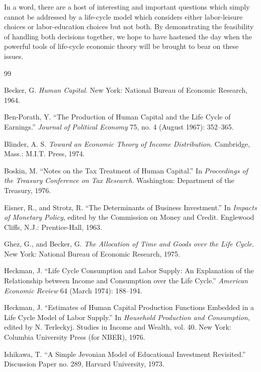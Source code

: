 \documentclass[11pt,fleqn]{article}
\begin{document}
In a word, there are a host of interesting and important questions which simply cannot be addressed by a life-cycle model which considers either labor-leisure choices or labor-education choices but not both. By demonstrating the feasibility of handling both decisions together, we hope to have hastened the day when the powerful tools of life-cycle economic theory will be brought to bear on these issues.

\begin{thebibliography}{99}

Becker, G. \textit{Human Capital}. New York: National Bureau of Economic Research, 1964.

Ben-Porath, Y. ``The Production of Human Capital and the Life Cycle of Earnings.'' \textit{Journal of Political Economy} 75, no. 4 (August 1967): 352--365.

Blinder, A. S. \textit{Toward an Economic Theory of Income Distribution}. Cambridge, Mass.: M.I.T. Press, 1974.

Boskin, M. ``Notes on the Tax Treatment of Human Capital.'' In \textit{Proceedings of the Treasury Conference on Tax Research}. Washington: Department of the Treasury, 1976.

Eisner, R., and Strotz, R. ``The Determinants of Business Investment.'' In \textit{Impacts of Monetary Policy}, edited by the Commission on Money and Credit. Englewood Cliffs, N.J.: Prentice-Hall, 1963.

Ghez, G., and Becker, G. \textit{The Allocation of Time and Goods over the Life Cycle}. New York: National Bureau of Economic Research, 1975.

Heckman, J. ``Life Cycle Consumption and Labor Supply: An Explanation of the Relationship between Income and Consumption over the Life Cycle.'' \textit{American Economic Review} 64 (March 1974): 188--194.

Heckman, J. ``Estimates of Human Capital Production Functions Embedded in a Life Cycle Model of Labor Supply.'' In \textit{Household Production and Consumption}, edited by N. Terleckyj. Studies in Income and Wealth, vol. 40. New York: Columbia University Press (for NBER), 1976.

Ishikawa, T. ``A Simple Jevonian Model of Educational Investment Revisited.'' Discussion Paper no. 289, Harvard University, 1973.


\end{thebibliography}
\end{document}
